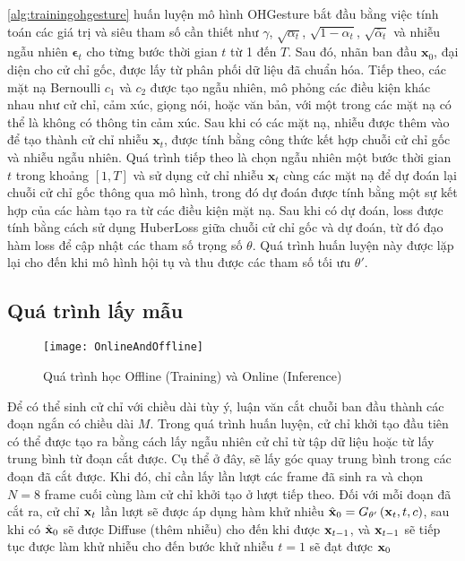\autoref{alg:trainingohgesture} huấn luyện mô hình OHGesture bắt đầu bằng việc tính toán các giá trị và siêu tham số cần thiết như $\gamma$, $\sqrt{\alpha_t}$, $\sqrt{1 - \alpha_t}$, $\sqrt{\bar{\alpha}_t}$ và nhiễu ngẫu nhiên $\boldsymbol{\epsilon}_t$ cho từng bước thời gian $t$ từ 1 đến $T$. Sau đó, nhãn ban đầu $\mathbf{x}_0$, đại diện cho cử chỉ gốc, được lấy từ phân phối dữ liệu đã chuẩn hóa. Tiếp theo, các mặt nạ Bernoulli $c_1$ và $c_2$ được tạo ngẫu nhiên, mô phỏng các điều kiện khác nhau như cử chỉ, cảm xúc, giọng nói, hoặc văn bản, với một trong các mặt nạ có thể là không có thông tin cảm xúc. Sau khi có các mặt nạ, nhiễu được thêm vào để tạo thành cử chỉ nhiễu $\mathbf{x}_t$, được tính bằng công thức kết hợp chuỗi cử chỉ gốc và nhiễu ngẫu nhiên. Quá trình tiếp theo là chọn ngẫu nhiên một bước thời gian $t$ trong khoảng $[1, T]$ và sử dụng cử chỉ nhiễu $\mathbf{x}_t$ cùng các mặt nạ để dự đoán lại chuỗi cử chỉ gốc thông qua mô hình, trong đó dự đoán được tính bằng một sự kết hợp của các hàm tạo ra từ các điều kiện mặt nạ. Sau khi có dự đoán, loss được tính bằng cách sử dụng HuberLoss giữa chuỗi cử chỉ gốc và dự đoán, từ đó đạo hàm loss để cập nhật các tham số trọng số $\theta$. Quá trình huấn luyện này được lặp lại cho đến khi mô hình hội tụ và thu được các tham số tối ưu $\theta'$.


\subsection{Quá trình lấy mẫu}

\begin{figure}[H]
	\centering
	\texttt{[image: OnlineAndOffline]}
	\caption{Quá trình học Offline (Training) và Online (Inference)}
	\label{fig:OnlineAndOffline}
\end{figure}

Để có thể sinh cử chỉ với chiều dài tùy ý, luận văn cắt chuỗi ban đầu thành các đoạn ngắn có chiều dài $M$. Trong quá trình huấn luyện, cử chỉ khởi tạo đầu tiên có thể được tạo ra bằng cách lấy ngẫu nhiên cử chỉ từ tập dữ liệu hoặc từ lấy trung bình từ đoạn cắt được. Cụ thể ở đây, sẽ lấy góc quay trung bình trong các đoạn đã cắt được. Khi đó, chỉ cần lấy lần lượt các frame đã sinh ra và chọn $N = 8$ frame cuối cùng làm cử chỉ khởi tạo ở lượt tiếp theo. Đối với mỗi đoạn đã cắt ra, cử chỉ $\mathbf{x}_{t}$ lần lượt sẽ được áp dụng hàm khử nhiều $\hat{\mathbf{x}}_{0} = G_{\theta'} \left( \mathbf{x}_{t}, t, c\right)$, sau khi có $\hat{\mathbf{x}}_{0}$ sẽ được Diffuse (thêm nhiễu) cho đến khi được  $\mathbf{x}_{t-1}$, và $\mathbf{x}_{t-1}$ sẽ tiếp tục được làm khử nhiễu cho đến bước khử nhiễu $t=1$ sẽ đạt được $\mathbf{x}_{0}$ 

